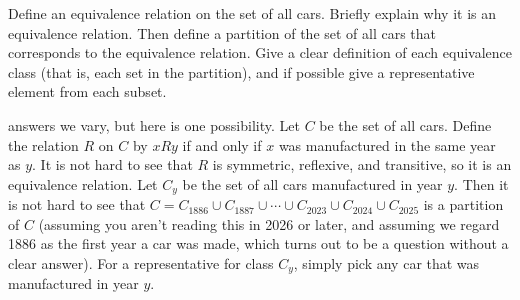 \begin{requ}
Define an equivalence relation on the set of all cars. 
Briefly explain why it is an equivalence relation.
Then define a partition of the set of all cars that corresponds to the equivalence relation.
Give a clear definition of each equivalence class (that is, each set in the partition), 
and if possible give a representative element from each subset.
\begin{requanswer}
answers we vary, but here is one possibility.
Let $C$ be the set of all cars.
Define the relation $R$ on $C$ by $x R y$ if and only if $x$ was manufactured in the same year as $y$.
It is not hard to see that $R$ is symmetric, reflexive, and transitive, so it is an equivalence relation.
Let $C_y$ be the set of all cars manufactured in year $y$.
Then it is not hard to see that $C=C_{1886}\cup C_{1887}\cup\cdots\cup C_{2023}\cup C_{2024}\cup C_{2025}$
is a partition of $C$ (assuming you aren't reading this in 2026 or later, and assuming we regard 1886 as the first year
a car was made, which turns out to be a question without a clear answer).
For a representative for class $C_y$, simply pick any car that was manufactured in year $y$.
\end{requanswer}
\end{requ}

